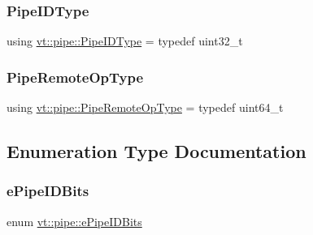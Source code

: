 \mbox{\label{namespacevt_1_1pipe_a8aa7908de242917ac0922b9e9c85fea4}} 
\subsubsection{\texorpdfstring{Pipe\+I\+D\+Type}{PipeIDType}}
{\footnotesize\ttfamily using \hyperlink{namespacevt_1_1pipe_a8aa7908de242917ac0922b9e9c85fea4}{vt\+::pipe\+::\+Pipe\+I\+D\+Type} = typedef uint32\+\_\+t}

\mbox{\label{namespacevt_1_1pipe_a9f156f00d06693969d89a230a38eab52}} 
\subsubsection{\texorpdfstring{Pipe\+Remote\+Op\+Type}{PipeRemoteOpType}}
{\footnotesize\ttfamily using \hyperlink{namespacevt_1_1pipe_a9f156f00d06693969d89a230a38eab52}{vt\+::pipe\+::\+Pipe\+Remote\+Op\+Type} = typedef uint64\+\_\+t}



\subsection{Enumeration Type Documentation}
\mbox{\label{namespacevt_1_1pipe_a21eef17afd7b326e3b65894dffa25901}} 
\subsubsection{\texorpdfstring{e\+Pipe\+I\+D\+Bits}{ePipeIDBits}}
{\footnotesize\ttfamily enum \hyperlink{namespacevt_1_1pipe_a21eef17afd7b326e3b65894dffa25901}{vt\+::pipe\+::e\+Pipe\+I\+D\+Bits}}

